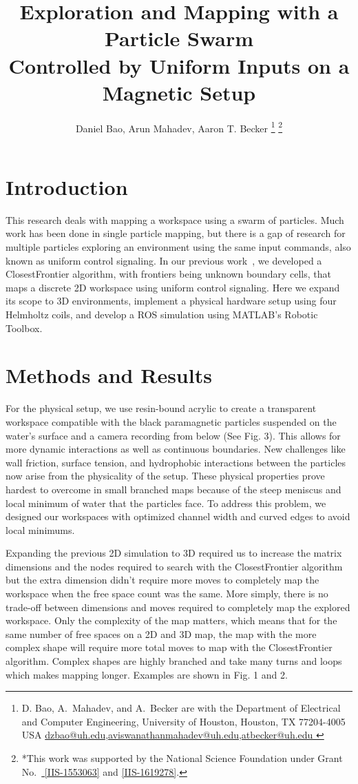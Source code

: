 \documentclass[letterpaper, 9 pt, conference]{ieeeconf}  %
\title{\LARGE \bf
Exploration and Mapping with a Particle Swarm\\ Controlled by Uniform Inputs on a Magnetic Setup
}
\author{Daniel Bao, Arun Mahadev, Aaron T. Becker%
\thanks{D. Bao, A.~Mahadev, and A.~Becker are with the Department of Electrical and Computer Engineering,  University of Houston, Houston, TX 77204-4005 USA 
      \protect\url{dzbao@uh.edu,aviswanathanmahadev@uh.edu,atbecker@uh.edu }}
\thanks{*This work was supported by the National Science Foundation under Grant No.\ \href{http://nsf.gov/awardsearch/showAward?AWD_ID=1553063}{ [IIS-1553063]} and \href{http://nsf.gov/awardsearch/showAward?AWD_ID=1619278}{[IIS-1619278]}.}%
}
\begin{document}
\maketitle
\thispagestyle{empty}
\pagestyle{empty}


\section{Introduction}\label{sec:Introduction}
	This research deals with mapping a workspace using a swarm of particles. Much work has been done in single particle mapping, but there is a gap of research for multiple particles exploring an environment using the same input commands, also known as uniform control signaling. In our previous work~\cite{AAM}, we developed a ClosestFrontier algorithm, with frontiers being unknown boundary cells, that maps a discrete 2D workspace using uniform control signaling. Here we expand its scope to 3D environments, implement a physical hardware setup using four Helmholtz coils, and develop a ROS simulation using MATLAB's Robotic Toolbox.
\section{Methods and Results}\label{sec:Methods and Results}
	For the physical setup, we use resin-bound acrylic to create a transparent workspace compatible with the black paramagnetic particles suspended on the water's surface and a camera recording from below (See Fig. 3). This allows for more dynamic interactions as well as continuous boundaries. New challenges like wall friction, surface tension, and  hydrophobic interactions between the particles now arise from the physicality of the setup. These physical properties prove hardest to overcome in small branched maps because of the steep meniscus and local minimum of water that the particles face. To address this problem, we designed our workspaces with optimized channel width and curved edges to avoid local minimums.
	
	Expanding the previous 2D simulation to 3D required us to increase the matrix dimensions and the nodes required to search with the ClosestFrontier algorithm but the extra dimension didn't require more moves to completely map the workspace when the free space count was the same. More simply, there is no trade-off between dimensions and moves required to completely map the explored workspace. Only the complexity of the map matters, which means that for the same number of free spaces on a 2D and 3D map, the map with the more complex shape will require more total moves to map with the ClosestFrontier algorithm. Complex shapes are highly branched and take many turns and loops which makes mapping longer. Examples are shown in Fig. 1 and 2.
	
\end{document}
